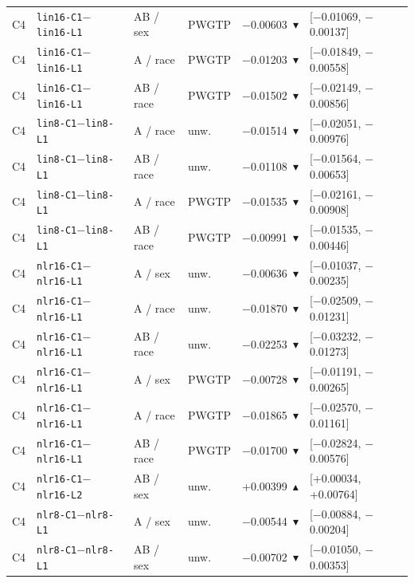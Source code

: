 \begin{tabular}{@{}llllrl@{}}
C4 & \texttt{lin16-C1}$-$\texttt{lin16-L1} & AB / sex & PWGTP & $-$0.00603~$\blacktriangledown$ & [$-$0.01069, $-$0.00137] \\
C4 & \texttt{lin16-C1}$-$\texttt{lin16-L1} & A / race & PWGTP & $-$0.01203~$\blacktriangledown$ & [$-$0.01849, $-$0.00558] \\
C4 & \texttt{lin16-C1}$-$\texttt{lin16-L1} & AB / race & PWGTP & $-$0.01502~$\blacktriangledown$ & [$-$0.02149, $-$0.00856] \\
C4 & \texttt{lin8-C1}$-$\texttt{lin8-L1} & A / race & unw. & $-$0.01514~$\blacktriangledown$ & [$-$0.02051, $-$0.00976] \\
C4 & \texttt{lin8-C1}$-$\texttt{lin8-L1} & AB / race & unw. & $-$0.01108~$\blacktriangledown$ & [$-$0.01564, $-$0.00653] \\
C4 & \texttt{lin8-C1}$-$\texttt{lin8-L1} & A / race & PWGTP & $-$0.01535~$\blacktriangledown$ & [$-$0.02161, $-$0.00908] \\
C4 & \texttt{lin8-C1}$-$\texttt{lin8-L1} & AB / race & PWGTP & $-$0.00991~$\blacktriangledown$ & [$-$0.01535, $-$0.00446] \\
C4 & \texttt{nlr16-C1}$-$\texttt{nlr16-L1} & A / sex & unw. & $-$0.00636~$\blacktriangledown$ & [$-$0.01037, $-$0.00235] \\
C4 & \texttt{nlr16-C1}$-$\texttt{nlr16-L1} & A / race & unw. & $-$0.01870~$\blacktriangledown$ & [$-$0.02509, $-$0.01231] \\
C4 & \texttt{nlr16-C1}$-$\texttt{nlr16-L1} & AB / race & unw. & $-$0.02253~$\blacktriangledown$ & [$-$0.03232, $-$0.01273] \\
C4 & \texttt{nlr16-C1}$-$\texttt{nlr16-L1} & A / sex & PWGTP & $-$0.00728~$\blacktriangledown$ & [$-$0.01191, $-$0.00265] \\
C4 & \texttt{nlr16-C1}$-$\texttt{nlr16-L1} & A / race & PWGTP & $-$0.01865~$\blacktriangledown$ & [$-$0.02570, $-$0.01161] \\
C4 & \texttt{nlr16-C1}$-$\texttt{nlr16-L1} & AB / race & PWGTP & $-$0.01700~$\blacktriangledown$ & [$-$0.02824, $-$0.00576] \\
C4 & \texttt{nlr16-C1}$-$\texttt{nlr16-L2} & AB / sex & unw. & +0.00399~$\blacktriangle$ & [+0.00034, +0.00764] \\
C4 & \texttt{nlr8-C1}$-$\texttt{nlr8-L1} & A / sex & unw. & $-$0.00544~$\blacktriangledown$ & [$-$0.00884, $-$0.00204] \\
C4 & \texttt{nlr8-C1}$-$\texttt{nlr8-L1} & AB / sex & unw. & $-$0.00702~$\blacktriangledown$ & [$-$0.01050, $-$0.00353] \\

\end{tabular}
